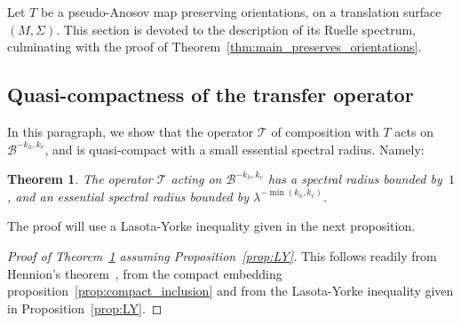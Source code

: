 \documentclass[JEP,XML,SOM,Unicode]{cedram}
\newcommand{\boB}{\mathcal{B}}
\newcommand{\boT}{\mathcal{T}}
\newtheorem{thm}{Theorem}[section]
\theoremstyle{definition}
\numberwithin{equation}{section}
\begin{document}
\label{sec:Ruelle_spectrum}

Let $T$ be a pseudo-Anosov map preserving orientations, on a translation
surface $(M,\Sigma)$. This section is devoted to the description of its
Ruelle spectrum, culminating with the proof of
Theorem~\ref{thm:main_preserves_orientations}.

\subsection{Quasi-compactness of the transfer operator}

In this paragraph, we show that the operator $\boT$ of composition with $T$
acts on $\boB^{-k_h, k_v}$, and is quasi-compact with a small essential
spectral radius. Namely:

\begin{thm}
\label{thm:rho_ess} The operator $\boT$ acting on $\boB^{-k_h, k_v}$ has a
spectral radius bounded by~$1$, and an essential spectral radius bounded by
$\lambda^{- \min(k_h, k_v)}$.
\end{thm}

The proof will use a Lasota-Yorke inequality given in the next proposition.

\begin{proof}[Proof of Theorem~\ref{thm:rho_ess} assuming Proposition~\ref{prop:LY}]
This follows readily from Hennion's theorem~\cite{hennion}, from the compact
embedding proposition~\ref{prop:compact_inclusion} and from the Lasota-Yorke
inequality given in Proposition~\ref{prop:LY}.
\end{proof}
\end{document}
